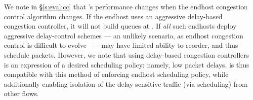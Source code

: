 We note in \S\ref{s:eval:cc} that \name's performance changes when the endhost congestion control algorithm changes.
If the endhost uses an aggressive delay-based congestion controller, it will not build queues at \name.
If \emph{all} such endhosts deploy aggressive delay-control schemes --- an unlikely scenario, as endhost congestion control is difficult to evolve~\cite{quic} --- \name may have limited ability to reorder, and thus schedule packets.
However, we note that using delay-based congestion controllers is an expression of a desired scheduling policy: namely, low packet delays.
\name is thus compatible with this method of enforcing endhost scheduling policy, while additionally enabling isolation of the delay-sensitive traffic (via scheduling) from other flows.



%
